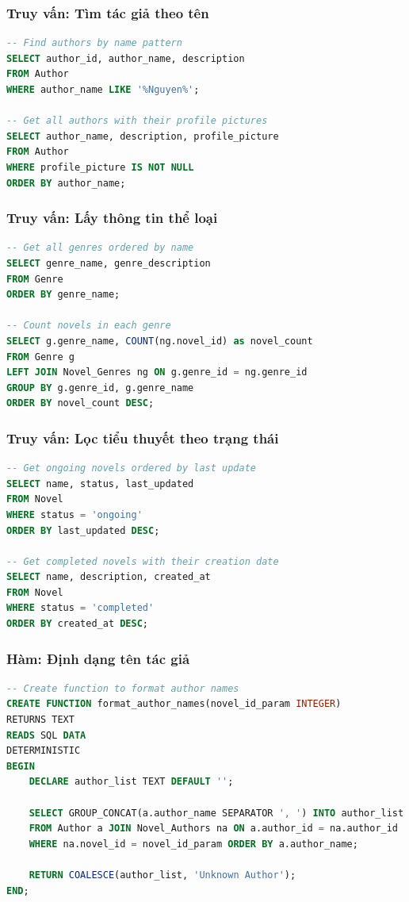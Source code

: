 \documentclass[12pt,aspectratio=169,handout]{beamer}
\begin{document}
\begin{frame}[fragile]
\frametitle{Truy vấn: Tìm tác giả theo tên}
\begin{lstlisting}[language=SQL, basicstyle=\small\ttfamily]
-- Find authors by name pattern
SELECT author_id, author_name, description 
FROM Author 
WHERE author_name LIKE '%Nguyen%';

-- Get all authors with their profile pictures
SELECT author_name, description, profile_picture
FROM Author 
WHERE profile_picture IS NOT NULL
ORDER BY author_name;
\end{lstlisting}
\end{frame}

\begin{frame}[fragile]
\frametitle{Truy vấn: Lấy thông tin thể loại}
\begin{lstlisting}[language=SQL, basicstyle=\small\ttfamily]
-- Get all genres ordered by name
SELECT genre_name, genre_description 
FROM Genre 
ORDER BY genre_name;

-- Count novels in each genre
SELECT g.genre_name, COUNT(ng.novel_id) as novel_count
FROM Genre g
LEFT JOIN Novel_Genres ng ON g.genre_id = ng.genre_id
GROUP BY g.genre_id, g.genre_name
ORDER BY novel_count DESC;
\end{lstlisting}
\end{frame}

\begin{frame}[fragile]
\frametitle{Truy vấn: Lọc tiểu thuyết theo trạng thái}
\begin{lstlisting}[language=SQL, basicstyle=\small\ttfamily]
-- Get ongoing novels ordered by last update
SELECT name, status, last_updated 
FROM Novel 
WHERE status = 'ongoing' 
ORDER BY last_updated DESC;

-- Get completed novels with their creation date
SELECT name, description, created_at
FROM Novel 
WHERE status = 'completed'
ORDER BY created_at DESC;
\end{lstlisting}
\end{frame}

\begin{frame}[fragile]
\frametitle{Hàm: Định dạng tên tác giả}
\begin{lstlisting}[language=SQL, basicstyle=\footnotesize\ttfamily]
-- Create function to format author names
CREATE FUNCTION format_author_names(novel_id_param INTEGER)
RETURNS TEXT
READS SQL DATA
DETERMINISTIC
BEGIN
    DECLARE author_list TEXT DEFAULT '';
    
    SELECT GROUP_CONCAT(a.author_name SEPARATOR ', ') INTO author_list
    FROM Author a JOIN Novel_Authors na ON a.author_id = na.author_id
    WHERE na.novel_id = novel_id_param ORDER BY a.author_name;
    
    RETURN COALESCE(author_list, 'Unknown Author');
END;
\end{lstlisting}
\end{frame}
\end{document}
